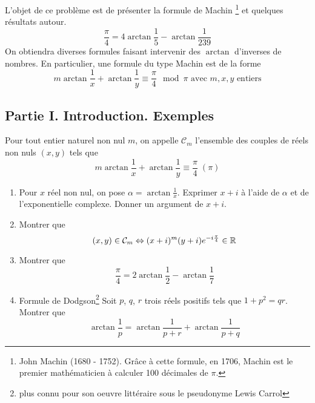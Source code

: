L'objet de ce problème est de présenter la formule de Machin \footnote{John Machin (1680 - 1752). Grâce à cette formule, en 1706, Machin est le premier mathématicien à calculer 100 décimales de $\pi$.} et quelques résultats autour.
\[\frac{\pi}{4}=4\arctan\frac{1}{5}-\arctan\frac{1}{239}\]
On obtiendra diverses formules faisant intervenir des $\arctan$ d'inverses de nombres. En particulier, une formule du type Machin est de la forme
\begin{displaymath}
m\arctan\frac{1}{x}+\arctan\frac{1}{y}\equiv\frac{\pi}{4} \mod \pi \text{ avec } m, x, y \text{ entiers}
\end{displaymath}

\subsection*{Partie I. Introduction. Exemples}
Pour tout entier naturel non nul $m$, on appelle $\mathcal{C}_m$ l'ensemble des couples de réels non nuls $(x,y)$ tels que
\[m\arctan\frac{1}{x}+\arctan\frac{1}{y}\equiv\frac{\pi}{4}\;(\pi)\]
\begin{enumerate}
\item Pour $x$ réel non nul, on pose $\alpha=\arctan\frac{1}{x}$. Exprimer $x+i$ à l'aide de $\alpha$ et de l'exponentielle complexe. Donner un argument de $x+i$.
\item Montrer que
\[(x,y)\in \mathcal{C}_m\Leftrightarrow (x+i)^m(y+i)e^{-i\frac{\pi}{4}}\in \mathbb{R}\]
\item Montrer que
\[\frac{\pi}{4}=2\arctan\frac{1}{2}-\arctan\frac{1}{7}\]
\item Formule de Dodgson\footnote{plus connu pour son oeuvre littéraire sous le pseudonyme Lewis Carrol}\newline
Soit $p$, $q$, $r$ trois réels positifs tels que $1+p^2=qr$. Montrer que
\[\arctan\frac{1}{p}=\arctan\frac{1}{p+r}+\arctan\frac{1}{p+q}\]
\end{enumerate}

